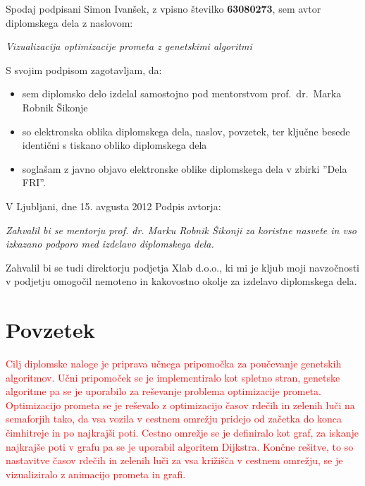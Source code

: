 \documentclass[a4paper, 12pt]{book}
\newcommand{\clearemptydoublepage}{\newpage{\pagestyle{empty}\cleardoublepage}}
\begin{document}
\vspace{1cm}
\noindent Spodaj podpisani Simon Ivan\v sek,
z vpisno \v stevilko \textbf{63080273}, sem avtor  diplomskega dela z naslovom:
   
\vspace{0.5cm}
\emph{Vizualizacija optimizacije prometa z genetskimi algoritmi}

\vspace{1.5cm}
\noindent S svojim podpisom zagotavljam, da:
\begin{itemize}
	\item sem diplomsko delo izdelal samostojno pod mentorstvom 
		prof.\ dr.\ Marka Robnik \v Sikonje

	\item	so elektronska oblika diplomskega dela, naslov, povzetek, ter klju\v cne besede identi\v cni s tiskano obliko diplomskega dela
	\item sogla\v sam z javno objavo elektronske oblike diplomskega dela v zbirki ''Dela FRI''.
\end{itemize}

\vspace{1cm}
\noindent V Ljubljani, dne 15. avgusta 2012 \hfill Podpis avtorja:

\clearemptydoublepage

\thispagestyle{empty}\mbox{}\vfill\null\it
Zahvalil bi se mentorju prof. dr. Marku Robnik \v Sikonji za koristne nasvete in vso izkazano podporo med izdelavo diplomskega dela.

Zahvalil bi se tudi direktorju podjetja Xlab d.o.o., ki mi je kljub moji navzo\v cnosti v podjetju omogo\v cil nemoteno in kakovostno okolje za izdelavo diplomskega dela.
\rm\normalfont
 
\clearemptydoublepage

\def\thepage{}%
\tableofcontents{}


\clearemptydoublepage

\chapter*{Povzetek}
\textcolor{red}{Cilj diplomske naloge je priprava u\v cnega pripomo\v cka za pou\v cevanje genetskih algoritmov. U\v cni pripomo\v cek se je implementiralo kot spletno stran, genetske algoritme pa se je uporabilo za re\v sevanje problema optimizacije prometa. Optimizacijo prometa se je re\v sevalo z optimizacijo \v casov rde\v cih in zelenih lu\v ci na semaforjih tako, da vsa vozila v cestnem omre\v zju pridejo od za\v cetka do konca \v cimhitreje in po najkraj\v si poti. Cestno omre\v zje se je definiralo kot graf, za iskanje najkraj\v se poti v grafu pa se je uporabil algoritem Dijkstra. Kon\v cne re\v sitve, to so nastavitve \v casov rde\v cih in zelenih lu\v ci za vsa kri\v zi\v s\v ca v cestnem omre\v zju, se je vizualiziralo z animacijo prometa in grafi.}
\end{document}
